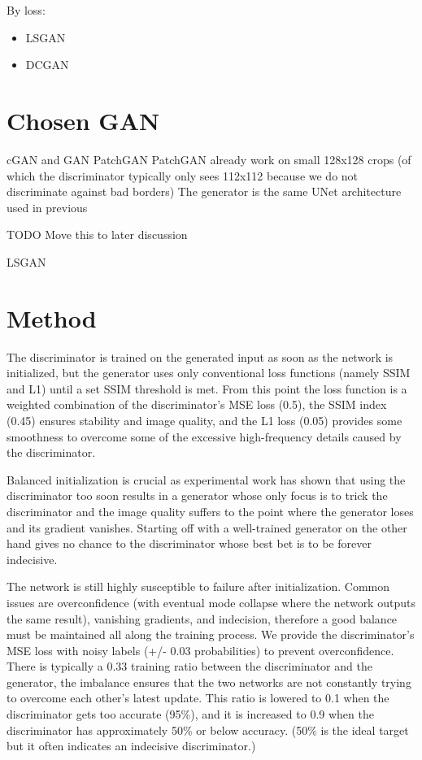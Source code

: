 By loss:
\begin{itemize}
\item \ac{LSGAN}
\item \ac{DCGAN}
\end{itemize}
\section{Chosen GAN}

cGAN and GAN
PatchGAN
PatchGAN  already work on small 128x128 crops (of which the discriminator typically only sees 112x112 because we do not discriminate against bad borders)
The generator is the same UNet architecture used in previous

TODO Move this to later discussion

LSGAN
\section{Method}
The discriminator is trained on the generated input as soon as the network is initialized, but the generator uses only conventional loss functions (namely \ac{SSIM} and L1) until a set SSIM threshold is met. From this point the loss function is a weighted combination of the discriminator's \ac{MSE} loss (0.5), the \ac{SSIM} index (0.45) ensures stability and image quality, and the L1 loss (0.05) provides some smoothness to overcome some of the excessive high-frequency details caused by the discriminator. 

Balanced initialization is crucial as experimental work has shown that using the discriminator too soon results in a generator whose only focus is to trick the discriminator and the image quality suffers to the point where the generator loses and its gradient vanishes. Starting off with a well-trained generator on the other hand gives no chance to the discriminator whose best bet is to be forever indecisive.

The network is still highly susceptible to failure after initialization. Common issues are overconfidence (with eventual mode collapse where the network outputs the same result), vanishing gradients, and indecision, therefore a good balance must be maintained all along the training process. We provide the discriminator's \ac{MSE} loss with noisy labels (+/- 0.03 probabilities) to prevent overconfidence. There is typically a 0.33 training ratio between the discriminator and the generator, the imbalance ensures that the two networks are not constantly trying to overcome each other's latest update. This ratio is lowered to 0.1 when the discriminator gets too accurate (95\%), and it is increased to 0.9 when the discriminator has approximately 50\% or below accuracy. (50\% is the ideal target but it often indicates an indecisive discriminator.)

